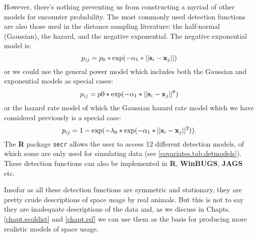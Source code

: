 However, there's nothing preventing us from constructing a myriad of
other models for encounter probability.
The most
commonly used detection functions are also those used in the distance
sampling literature: the half-normal (Gaussian), the hazard, and the negative
exponential.  The negative exponential model is: 
\[
p_{ij} = p_{0}*\exp(-\alpha_{1} *||{\bf s}_{i}-{\bf x}_{j}||)
\]
or we could use the general power model \citep{russell_etal:2012} which includes both the
Gaussian and exponential models as special cases:
\[
p_{ij} = p0*\exp(-\alpha_{1} *||{\bf s}_{i}-{\bf x}_{j}||^{\theta} )
\]
or the hazard rate model \citep{hayes_buckland:1983} of which the
Gaussian hazard rate model which we have considered previously is a
special case: 
\[
p_{ij} = 1-\exp(-\lambda_{0}* \exp(-\alpha_{1} *||{\bf s}_{i}-{\bf
  x}_{j}||^{2}) ).
\]
The {\bf R} package
{\tt secr} allows the user to access 12 different detection models, of which
some are only used for simulating data (see \ref{covariates.tab.detmodels}). These detection
functions can  also be implemented in {\bf R}, {\bf WinBUGS},
{\bf JAGS} etc.

Insofar as all these detection functions are symmetric and stationary, they are pretty
crude descriptions of space usage by real animals. But this is not to
say they are inadequate descriptions of the data and, as we discuss in
Chapts. \ref{chapt.ecoldist} and \ref{chapt.rsf} we can use them as the
basis for producing more realistic models of space usage.  


